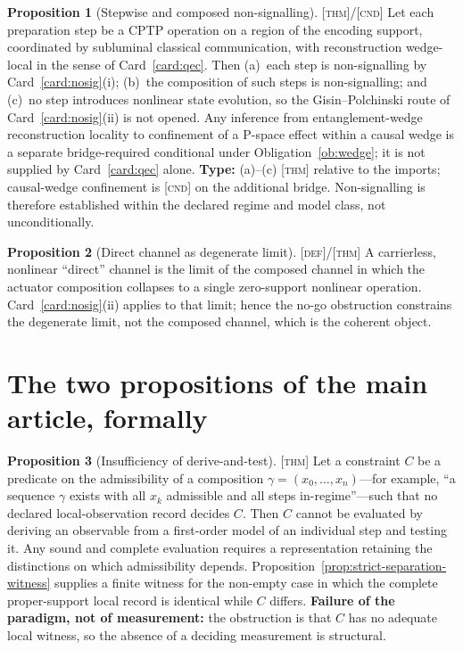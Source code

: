 \documentclass[11pt]{article}
\newcommand{\Defn}{\textsc{[def]}}
\newcommand{\Thm}{\textsc{[thm]}}
\newcommand{\Cnd}{\textsc{[cnd]}}
\theoremstyle{definition}
\newtheorem{sproposition}{Proposition}
\begin{document}
\begin{sproposition}[Stepwise and composed non-signalling]\label{prop:nosignal}
\Thm{}/\Cnd{} Let each preparation step be a CPTP operation on a region of the
encoding support, coordinated by subluminal classical communication, with
reconstruction wedge-local in the sense of Card~\ref{card:qec}. Then (a)~each step
is non-signalling by Card~\ref{card:nosig}(i); (b)~the composition of such steps
is non-signalling; and (c)~no step introduces nonlinear state evolution, so the
Gisin--Polchinski route of Card~\ref{card:nosig}(ii) is not opened. Any inference
from entanglement-wedge reconstruction locality to confinement of a P-space effect
within a causal wedge is a separate bridge-required conditional under
Obligation~\ref{ob:wedge}; it is not supplied by Card~\ref{card:qec} alone.
\textbf{Type:} (a)--(c) \Thm{} relative to the imports; causal-wedge confinement
is \Cnd{} on the additional bridge. Non-signalling is therefore established within
the declared regime and model class, not unconditionally.
\end{sproposition}

\begin{sproposition}[Direct channel as degenerate limit]\label{prop:degenerate}
\Defn{}/\Thm{} A carrierless, nonlinear ``direct'' channel is the limit of the
composed channel in which the actuator composition collapses to a single
zero-support nonlinear operation. Card~\ref{card:nosig}(ii) applies to that limit;
hence the no-go obstruction constrains the degenerate limit, not the composed
channel, which is the coherent object.
\end{sproposition}

\section{The two propositions of the main article, formally}
\label{supp:props}

\begin{sproposition}[Insufficiency of derive-and-test]\label{prop:insufficiency-supp}
\Thm{} Let a constraint $C$ be a predicate on the admissibility of a composition
$\gamma = (x_0,\dots,x_n)$---for example, ``a sequence $\gamma$ exists with all
$x_k$ admissible and all steps in-regime''---such that no declared local-observation
record decides $C$. Then $C$ cannot be evaluated by deriving an observable from a
first-order model of an individual step and testing it. Any sound and complete
evaluation requires a representation retaining the distinctions on which
admissibility depends. Proposition~\ref{prop:strict-separation-witness} supplies a
finite witness for the non-empty case in which the complete proper-support local
record is identical while $C$ differs. \textbf{Failure of the paradigm, not of
measurement:} the obstruction is that $C$ has no adequate local witness, so the
absence of a deciding measurement is structural.
\end{sproposition}
\end{document}
